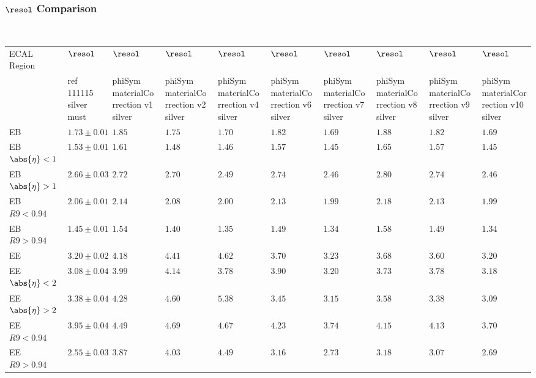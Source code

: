 \documentclass[8pt,serif]{beamer}
\begin{document}
\begin{frame}
  \frametitle{$\resol $ Comparison}
\\


  
  \begin{center}
    \emph{\dataSample}\xspace \invMassVarName

\tiny \begin{tabular}{|l|p{30pt}|p{18pt}|p{18pt}|p{18pt}|p{18pt}|p{18pt}|p{18pt}|p{18pt}|p{18pt}|} \hline  
ECAL Region &  $\resol$ &  $\resol$ &  $\resol$ &  $\resol$ &  $\resol$ &  $\resol$ &  $\resol$ &  $\resol$ &  $\resol$ \\ 
 &  ref 111115 silver must &  phiSym materialCorrection v1 silver &  phiSym materialCorrection v2 silver &  phiSym materialCorrection v4 silver &  phiSym materialCorrection v6 silver &  phiSym materialCorrection v7 silver &  phiSym materialCorrection v8 silver &  phiSym materialCorrection v9 silver &  phiSym materialCorrection v10 silver \\ 
\hline                 
EB & $1.73 \pm 0.01$ & $1.85$ & $1.75$ & $1.70$ & $1.82$ & $1.69$ & $1.88$ & $1.82$ & $1.69$ \\
EB $\abs{\eta} < 1$ & $1.53 \pm 0.01$ & $1.61$ & $1.48$ & $1.46$ & $1.57$ & $1.45$ & $1.65$ & $1.57$ & $1.45$ \\
EB $\abs{\eta} > 1$ & $2.66 \pm 0.03$ & $2.72$ & $2.70$ & $2.49$ & $2.74$ & $2.46$ & $2.80$ & $2.74$ & $2.46$ \\
EB $R9 < 0.94$ & $2.06 \pm 0.01$ & $2.14$ & $2.08$ & $2.00$ & $2.13$ & $1.99$ & $2.18$ & $2.13$ & $1.99$ \\
EB $R9 > 0.94$ & $1.45 \pm 0.01$ & $1.54$ & $1.40$ & $1.35$ & $1.49$ & $1.34$ & $1.58$ & $1.49$ & $1.34$ \\
EE & $3.20 \pm 0.02$ & $4.18$ & $4.41$ & $4.62$ & $3.70$ & $3.23$ & $3.68$ & $3.60$ & $3.20$ \\
EE $\abs{\eta} < 2$ & $3.08 \pm 0.04$ & $3.99$ & $4.14$ & $3.78$ & $3.90$ & $3.20$ & $3.73$ & $3.78$ & $3.18$ \\
EE $\abs{\eta} > 2$ & $3.38 \pm 0.04$ & $4.28$ & $4.60$ & $5.38$ & $3.45$ & $3.15$ & $3.58$ & $3.38$ & $3.09$ \\
EE $R9 < 0.94$ & $3.95 \pm 0.04$ & $4.49$ & $4.69$ & $4.67$ & $4.23$ & $3.74$ & $4.15$ & $4.13$ & $3.70$ \\
EE $R9 > 0.94$ & $2.55 \pm 0.03$ & $3.87$ & $4.03$ & $4.49$ & $3.16$ & $2.73$ & $3.18$ & $3.07$ & $2.69$ \\
\hline  
\end{tabular} 
  \end{center}


\end{frame}
\end{document}
